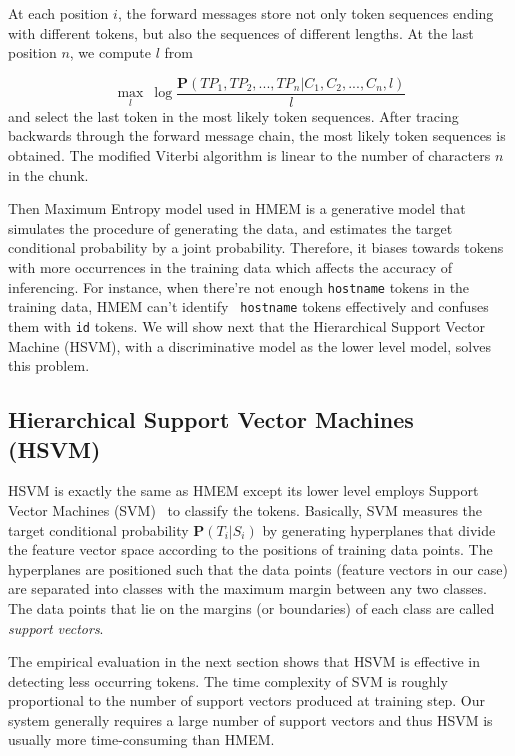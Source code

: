 At each position $i$, the forward messages store not only token
sequences ending with different tokens, but also the sequences of different
lengths. At the last position $n$, we compute $l$ from 

\begin{equation}
\max_{l}~ \log \frac{\mathbf{P}(TP_1, TP_2, ...,
TP_n|C_1, C_2, ..., C_n,l)}{l}
\end{equation}
\noindent
and select the last token in the most likely token
sequences. After tracing backwards through the forward message chain,
the most likely token sequences is obtained. The modified Viterbi
algorithm is linear to the number of characters $n$ in the chunk.


Then Maximum Entropy model used in HMEM is a
generative model that simulates the procedure of generating the data, and
estimates the target conditional probability by a joint
probability. Therefore, it biases towards tokens with more
occurrences in the training data which affects the accuracy of inferencing. 
For instance, when there're not enough
{\tt hostname} tokens in the training data, HMEM can't identify {\tt
hostname} tokens effectively and confuses them with {\tt id}
tokens. We will show next that the Hierarchical
Support Vector Machine (HSVM), with a discriminative model as the
lower level model, solves this problem.

\subsection{Hierarchical Support Vector Machines (HSVM)}\label{subsec:hsvm}

HSVM is exactly the same as HMEM except its lower
level employs Support Vector Machines (SVM)~\cite{CC01a} to classify
the tokens. 
Basically, SVM measures the target conditional probability $\mathbf{P}(T_i|S_i)$ 
by generating hyperplanes that divide the feature vector space according to the
positions of training data points. The hyperplanes are positioned such that the
data points (feature vectors in our case) are separated into classes with
the maximum margin between any two classes. The data points that lie on
the margins (or boundaries) of each class are called {\em support vectors}. 

The empirical evaluation in the next section shows that HSVM is effective
in detecting less occurring tokens. The time complexity of SVM 
is roughly proportional to the number of support vectors produced at training
step. Our system generally requires a large number of support vectors 
and thus HSVM is usually more time-consuming than HMEM.
